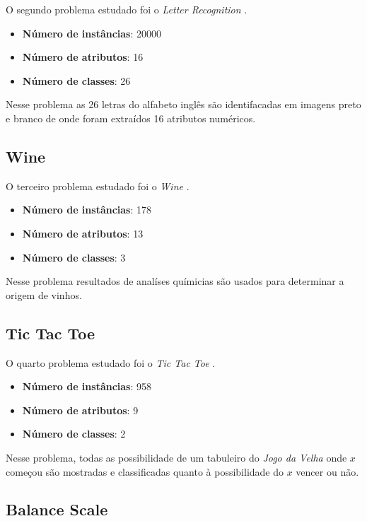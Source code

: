 O segundo problema estudado foi o \emph{Letter Recognition} \cite{bib-letter-recognition}.

\begin{itemize}	
	\item \textbf{Número de instâncias}: 20000
	\item \textbf{Número de atributos}: 16
	\item \textbf{Número de classes}: 26
\end{itemize}

Nesse problema as 26 letras do alfabeto inglês são identifacadas em imagens preto e branco de onde foram extraídos 16 atributos numéricos.

\subsection{Wine}

O terceiro problema estudado foi o \emph{Wine} \cite{bib-wine}.

\begin{itemize}	
	\item \textbf{Número de instâncias}: 178
	\item \textbf{Número de atributos}: 13
	\item \textbf{Número de classes}: 3
\end{itemize}

Nesse problema resultados de analíses químicias são usados para determinar a origem de vinhos.

\subsection{Tic Tac Toe}

O quarto problema estudado foi o \emph{Tic Tac Toe} \cite{bib-tic-tac-toe}.

\begin{itemize}	
	\item \textbf{Número de instâncias}: 958
	\item \textbf{Número de atributos}: 9	
	\item \textbf{Número de classes}: 2
\end{itemize}

Nesse problema, todas as possibilidade de um tabuleiro do \emph{Jogo da Velha} onde $x$ começou são mostradas e classificadas quanto à possibilidade do $x$ vencer ou não.

\subsection{Balance Scale}


